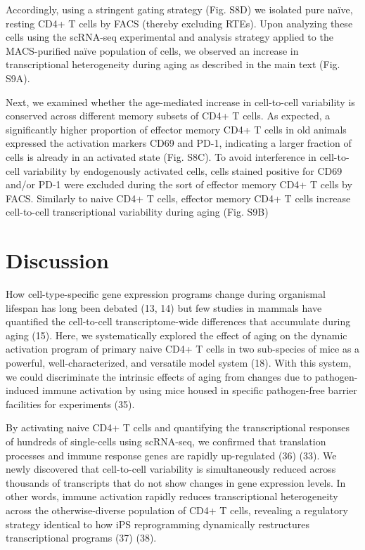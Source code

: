 Accordingly, using a stringent gating strategy (Fig. S8D) we isolated pure naïve, resting CD4+ T cells by FACS (thereby excluding RTEs). Upon analyzing these cells using the scRNA-seq experimental and analysis strategy applied to the MACS-purified naïve population of cells, we observed an increase in transcriptional heterogeneity during aging as described in the main text (Fig. S9A). 

Next, we examined whether the age-mediated increase in cell-to-cell variability is conserved across different memory subsets of CD4+ T cells. As expected, a significantly higher proportion of effector memory CD4+ T cells in old animals expressed the activation markers CD69 and PD-1, indicating a larger fraction of cells is already in an activated state (Fig. S8C).  To avoid interference in cell-to-cell variability by endogenously activated cells, cells stained positive for CD69 and/or PD-1 were excluded during the sort of effector memory CD4+ T cells by FACS. Similarly to naive CD4+ T cells, effector memory CD4+ T cells increase cell-to-cell transcriptional variability during aging (Fig. S9B) 

\section{Discussion}

How cell-type-specific gene expression programs change during organismal lifespan has long been debated (13, 14) but few studies in mammals have quantified the cell-to-cell transcriptome-wide differences that accumulate during aging (15). Here, we systematically explored the effect of aging on the dynamic activation program of primary naive CD4+ T cells in two sub-species of mice as a powerful, well-characterized, and versatile model system (18). With this system, we could discriminate the intrinsic effects of aging from changes due to pathogen-induced immune activation by using mice housed in specific pathogen-free barrier facilities for experiments (35).

By activating naive CD4+ T cells and quantifying the transcriptional responses of hundreds of single-cells using scRNA-seq, we confirmed that translation processes and immune response genes are rapidly up-regulated (36) (33). We newly discovered that cell-to-cell variability is simultaneously reduced across thousands of transcripts that do not show changes in gene expression levels. In other words, immune activation rapidly reduces transcriptional heterogeneity across the otherwise-diverse population of CD4+ T cells, revealing a regulatory strategy identical to how iPS reprogramming dynamically restructures transcriptional programs (37) (38). 

